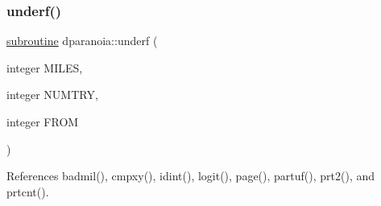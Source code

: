 \subsubsection{\texorpdfstring{underf()}{underf()}}
{\footnotesize\ttfamily \hyperlink{M__stopwatch_83_8txt_acfbcff50169d691ff02d4a123ed70482}{subroutine} dparanoia\+::underf (\begin{DoxyParamCaption}\item[{integer}]{M\+I\+L\+ES,  }\item[{integer}]{N\+U\+M\+T\+RY,  }\item[{integer}]{F\+R\+OM }\end{DoxyParamCaption})}



References badmil(), cmpxy(), idint(), logit(), page(), partuf(), prt2(), and prtcnt().

